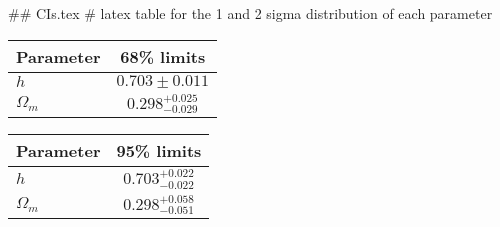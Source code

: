 ## CIs.tex
# latex table for the 1 and 2 sigma distribution of each parameter

\begin{tabular} { l  c}
 Parameter &  68\% limits\\
\hline
{\boldmath$h              $} & $0.703\pm 0.011            $\\
{\boldmath$\Omega_m       $} & $0.298^{+0.025}_{-0.029}   $\\
\hline
\end{tabular}

\begin{tabular} { l  c}
 Parameter &  95\% limits\\
\hline
{\boldmath$h              $} & $0.703^{+0.022}_{-0.022}   $\\
{\boldmath$\Omega_m       $} & $0.298^{+0.058}_{-0.051}   $\\
\hline
\end{tabular}
